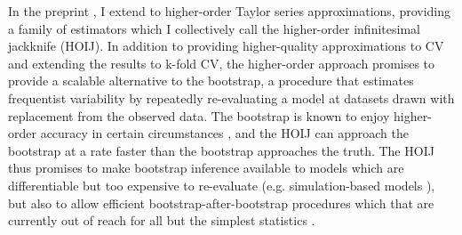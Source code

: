 In the preprint \citet{giordano:2019:hoij}, I extend \citet{giordano:2019:ij} to
higher-order Taylor series approximations, providing a family of estimators
which I collectively call the higher-order infinitesimal jackknife (HOIJ).  In
addition to providing higher-quality approximations to CV and extending the
results to k-fold CV, the higher-order approach promises to provide a scalable
alternative to the bootstrap, a procedure that estimates frequentist variability
by repeatedly re-evaluating a model at datasets drawn with replacement from the
observed data. The bootstrap is known to enjoy higher-order accuracy in certain
circumstances \citet{hall:2013:bootstrap}, and the HOIJ can approach the
bootstrap at a rate faster than the bootstrap approaches the truth.  The HOIJ
thus promises to make bootstrap inference available to models which are
differentiable but too expensive to re-evaluate (e.g. simulation-based models
\citep[Section 2.6]{baker:2019:workshop}), but also to allow efficient
bootstrap-after-bootstrap procedures which that are currently out of reach for
all but the simplest statistics \citep{efron:1994:bootstrap}.


%

